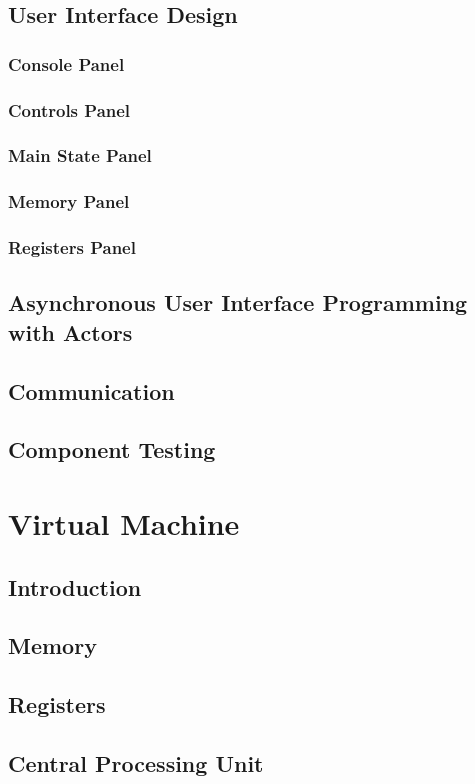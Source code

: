 \documentclass[a4paper,11pt]{report}
\begin{document}
\section{User Interface Design}
\subsection{Console Panel}
\subsection{Controls Panel}
\subsection{Main State Panel}
\subsection{Memory Panel}
\subsection{Registers Panel}
\section[Asynchronous UI Programming with Actors]{Asynchronous User Interface Programming with Actors}
\section{Communication}
\section{Component Testing}
\chapter{Virtual Machine}
\section{Introduction}
\section{Memory}
\section{Registers}
\section{Central Processing Unit}
\end{document}
